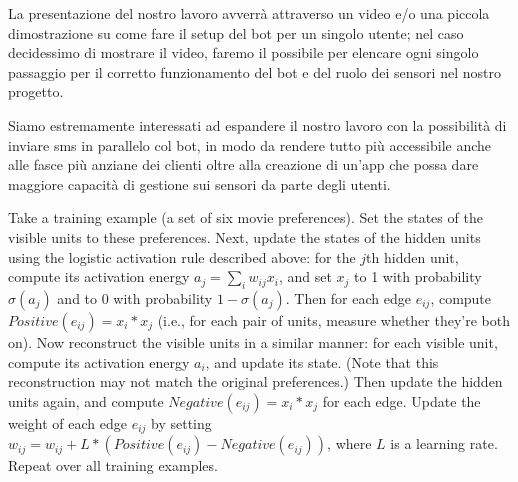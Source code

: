 La presentazione del nostro lavoro avverrà attraverso un video e/o una piccola dimostrazione su come fare il setup del bot per un singolo utente; nel caso decidessimo di mostrare il video, faremo il possibile per elencare ogni singolo passaggio per il corretto funzionamento del bot e del ruolo dei sensori nel nostro progetto.
\vspace{3mm}

Siamo estremamente interessati ad espandere il nostro lavoro con la possibilità di inviare sms in parallelo col bot, in modo da rendere tutto più accessibile anche alle fasce più anziane dei clienti oltre alla creazione di un'app che possa dare maggiore capacità di gestione sui sensori da parte degli utenti.




Take a training example (a set of six movie preferences). Set the states of the visible units to these preferences.
Next, update the states of the hidden units using the logistic activation rule described above: for the $j$th hidden unit, compute its activation energy $a_j = \sum_i w_{ij} x_i$, and set $x_j$ to 1 with probability $\sigma(a_j)$ and to 0 with probability $1 - \sigma(a_j)$. Then for each edge $e_{ij}$, compute $Positive(e_{ij}) = x_i * x_j$ (i.e., for each pair of units, measure whether they're both on).
Now reconstruct the visible units in a similar manner: for each visible unit, compute its activation energy $a_i$, and update its state. (Note that this reconstruction may not match the original preferences.) Then update the hidden units again, and compute $Negative(e_{ij}) = x_i * x_j$ for each edge.
Update the weight of each edge $e_{ij}$ by setting $w_{ij} = w_{ij} + L * (Positive(e_{ij}) - Negative(e_{ij}))$, where $L$ is a learning rate.
Repeat over all training examples.